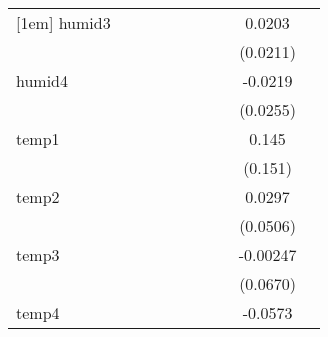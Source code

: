 {\begin{tabular}{l*{9}{c}}
[1em]
humid3      &                     &                     &                     &                     &                     &                     &                     &      0.0203         &                     \\
            &                     &                     &                     &                     &                     &                     &                     &    (0.0211)         &                     \\
[1em]
humid4      &                     &                     &                     &                     &                     &                     &                     &     -0.0219         &                     \\
            &                     &                     &                     &                     &                     &                     &                     &    (0.0255)         &                     \\
[1em]
temp1       &                     &                     &                     &                     &                     &                     &                     &       0.145         &                     \\
            &                     &                     &                     &                     &                     &                     &                     &     (0.151)         &                     \\
[1em]
temp2       &                     &                     &                     &                     &                     &                     &                     &      0.0297         &                     \\
            &                     &                     &                     &                     &                     &                     &                     &    (0.0506)         &                     \\
[1em]
temp3       &                     &                     &                     &                     &                     &                     &                     &    -0.00247         &                     \\
            &                     &                     &                     &                     &                     &                     &                     &    (0.0670)         &                     \\
[1em]
temp4       &                     &                     &                     &                     &                     &                     &                     &     -0.0573         &                     \\

\end{tabular}}
